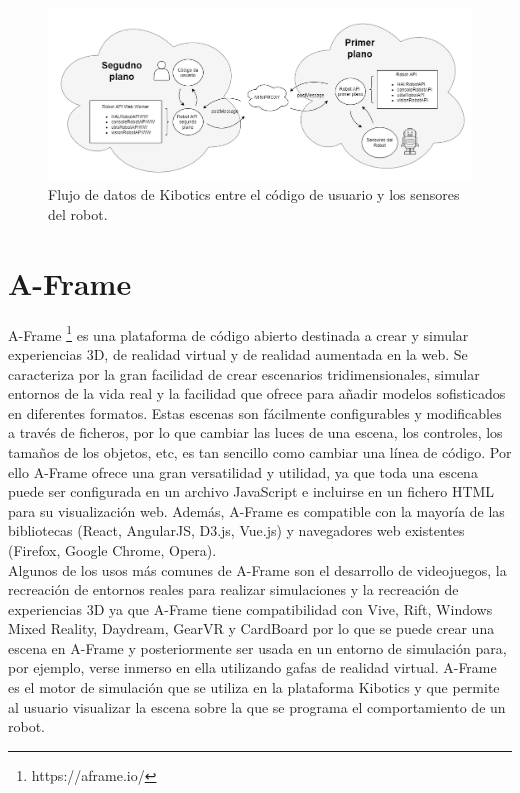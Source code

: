 \documentclass{report}
\begin{document}
\renewcommand{\figurename}{Figura}		
\begin{figure}[p]
	\centering
	 \includegraphics[scale=0.4]{images/kibotics.png}
	 \caption{Flujo de datos de Kibotics entre el código de usuario y los sensores del robot.}
\end{figure}

\newpage
\section{A-Frame}
A-Frame \footnote{https://aframe.io/} \cite{A-Frame} es una plataforma de código abierto destinada a crear y simular experiencias 3D, de realidad virtual y de realidad aumentada en la web. Se caracteriza por la gran facilidad de crear escenarios tridimensionales, simular entornos de la vida real y la facilidad que ofrece para añadir modelos sofisticados en diferentes formatos. Estas escenas son fácilmente configurables y modificables a través de ficheros, por lo que cambiar las luces de  una escena, los controles, los tamaños de los objetos, etc, es tan sencillo como cambiar una línea de código. Por ello A-Frame ofrece una gran versatilidad y utilidad, ya que toda una escena puede ser configurada en un archivo JavaScript e incluirse en un fichero HTML para su visualización web. Además, A-Frame es compatible con la mayoría de las bibliotecas (React, AngularJS, D3.js, Vue.js) y navegadores web existentes (Firefox, Google Chrome, Opera). 
\\

Algunos de los usos más comunes de A-Frame son el desarrollo de videojuegos, la recreación de entornos reales para realizar simulaciones y la  recreación de experiencias 3D ya que A-Frame tiene compatibilidad con Vive, Rift, Windows Mixed Reality, Daydream, GearVR y CardBoard por lo que se puede crear una escena en A-Frame y posteriormente ser usada en un entorno de simulación para, por ejemplo, verse inmerso en ella utilizando gafas de realidad virtual. A-Frame es el motor de simulación que se utiliza en la plataforma Kibotics y que permite al usuario visualizar la escena sobre la que se programa el comportamiento de un robot.
\\
\end{document}

